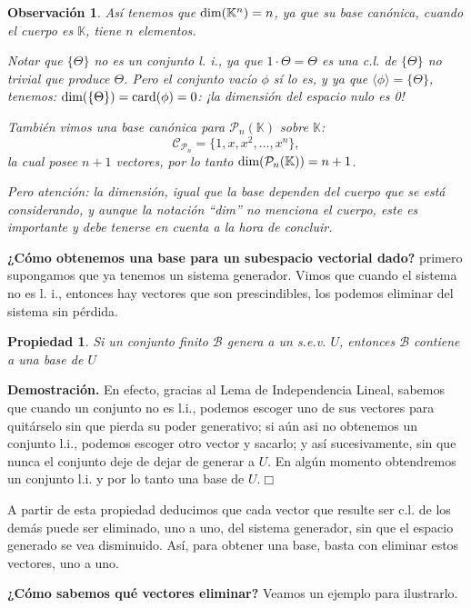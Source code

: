 \documentclass[12pt]{book}
\newtheorem{prop}{Propiedad}
\newtheorem{obs}{Observaci\'on}
\def\K{\mathbb{K}}
\def\P{\mathcal{P}}
\def\B{\mathcal{B}}
\def\Ccal{\mathcal{C}}
\def\card{\textup{card}}
\def\dim{\textup{dim}}
\begin{document}
\begin{obs}
Así tenemos que $\dim(\K^n)=n$, ya que su base canónica, cuando el cuerpo es $\K$, tiene $n$ elementos.

Notar que $\{\Theta\}$ no es un conjunto l. i., ya que $1\cdot \Theta=\Theta$ es una c.l. de $\{\Theta\}$ no trivial que produce $\Theta$.
Pero el conjunto vacío $\phi$ sí lo es, y ya que $\langle \phi\rangle=\{\Theta\}$, tenemos: $\dim(\{\Theta\})=\card(\phi)=0$: ¡la dimensión del espacio nulo es 0! 

También vimos una base canónica para $\mathcal{P}_{n}(\K)$ sobre $\K$:
$$\Ccal_{\P_n}=\{1,x,x^2,\dots,x^n\},$$
la cual posee $n+1$ vectores, por lo tanto $\dim(\mathcal{P}_{n}(\K))=n+1$.

Pero atención: la dimensión, igual que la base dependen del cuerpo que se está considerando, y aunque la notación ``dim'' no menciona el cuerpo, este es importante y debe tenerse en cuenta a la hora de concluir.
\end{obs}


{\bf ¿Cómo obtenemos una base para un subespacio vectorial dado?}
primero supongamos que ya tenemos un sistema generador.
Vimos que cuando el sistema no es {l. i.}, entonces hay vectores que son prescindibles, los podemos eliminar del sistema sin pérdida.

\begin{prop}
  Si un conjunto finito $\B$ genera a un s.e.v. $U$, entonces $\B$ contiene a una base de $U$
  \end{prop}
{\bf Demostración.} En efecto, gracias al Lema de Independencia Lineal, sabemos que cuando un conjunto no es l.i., podemos escoger uno de sus vectores para quitárselo sin que pierda su poder generativo; si aún asi no obtenemos un conjunto l.i., podemos escoger otro vector y sacarlo; y así sucesivamente, sin que nunca el conjunto deje de dejar de generar a $U$. En algún momento obtendremos un conjunto l.i. y por lo tanto una base de $U$.\hfill $\Box$ 

A partir de esta propiedad deducimos que cada vector que resulte ser c.l. de los demás puede ser eliminado, uno a uno, del sistema generador, sin que el espacio generado se vea disminuido.
Así, para obtener una base, basta con eliminar estos vectores, uno a uno.

{\bf ¿Cómo sabemos qué vectores eliminar?}
Veamos un ejemplo para ilustrarlo.
\end{document}
